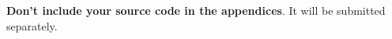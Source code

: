 \documentclass{l4proj}
\begin{document}
\begin{appendices}





\textbf{Don't include your source code in the appendices}. It will be
submitted separately.

\end{appendices}






\end{document}
